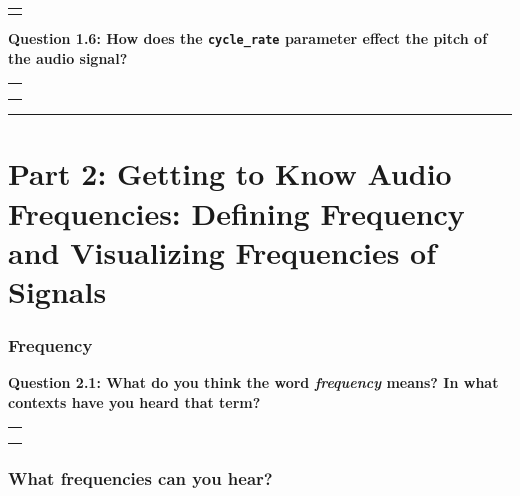 \documentclass[11pt]{article}
\begin{document}
\begin{longtable}[]{@{}l@{}}
\toprule
 \\
\midrule
\endhead
 \\
\bottomrule
\end{longtable}

\textbf{Question 1.6: How does the \texttt{cycle\_rate} parameter effect
the pitch of the audio signal?}

\begin{longtable}[]{@{}l@{}}
\toprule
 \\
\midrule
\endhead
 \\
 \\
 \\
\bottomrule
\end{longtable}

    \begin{center}\rule{\linewidth}{0.5pt}\end{center}

\hypertarget{part-2-getting-to-know-audio-frequencies-defining-frequency-and-visualizing-frequencies-of-signals}{%
\section*{Part 2: Getting to Know Audio Frequencies: Defining Frequency
and Visualizing Frequencies of
Signals}\label{part-2-getting-to-know-audio-frequencies-defining-frequency-and-visualizing-frequencies-of-signals}}

\hypertarget{frequency}{%
\subsubsection*{Frequency}\label{frequency}}

\textbf{Question 2.1: What do you think the word \emph{frequency} means?
In what contexts have you heard that term?}

\begin{longtable}[]{@{}l@{}}
\toprule
 \\
\midrule
\endhead
 \\
 \\
 \\
\bottomrule
\end{longtable}

\hypertarget{what-frequencies-can-you-hear}{%
\subsubsection*{What frequencies can you
hear?}\label{what-frequencies-can-you-hear}}
\end{document}
